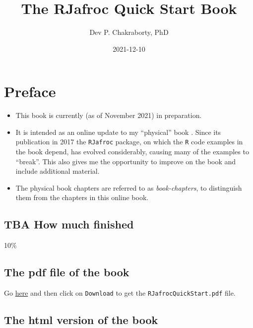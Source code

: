 \documentclass[
]{book}
\title{The RJafroc Quick Start Book}
\author{Dev P. Chakraborty, PhD}
\date{2021-12-10}
\providecommand{\tightlist}{%
  \setlength{\itemsep}{0pt}\setlength{\parskip}{0pt}}
\begin{document}
\maketitle

{
\setcounter{tocdepth}{1}
\tableofcontents
}
\hypertarget{preface}{%
\chapter*{Preface}\label{preface}}

\begin{itemize}
\tightlist
\item
  This book is currently (as of November 2021) in preparation.
\item
  It is intended as an online update to my ``physical'' book \citep{chakraborty2017observer}. Since its publication in 2017 the \texttt{RJafroc} package, on which the \texttt{R} code examples in the book depend, has evolved considerably, causing many of the examples to ``break''. This also gives me the opportunity to improve on the book and include additional material.
\item
  The physical book chapters are referred to as \emph{book-chapters}, to distinguish them from the chapters in this online book.
\end{itemize}

\hypertarget{tba-how-much-finished}{%
\section*{TBA How much finished}\label{tba-how-much-finished}}

10\%

\hypertarget{the-pdf-file-of-the-book}{%
\section*{The pdf file of the book}\label{the-pdf-file-of-the-book}}

Go \href{https://github.com/dpc10ster/RJafrocQuickStart/blob/gh-pages/RJafrocQuickStart.pdf}{here} and then click on \texttt{Download} to get the \texttt{RJafrocQuickStart.pdf} file.

\hypertarget{the-html-version-of-the-book}{%
\section*{The html version of the book}\label{the-html-version-of-the-book}}
\end{document}
